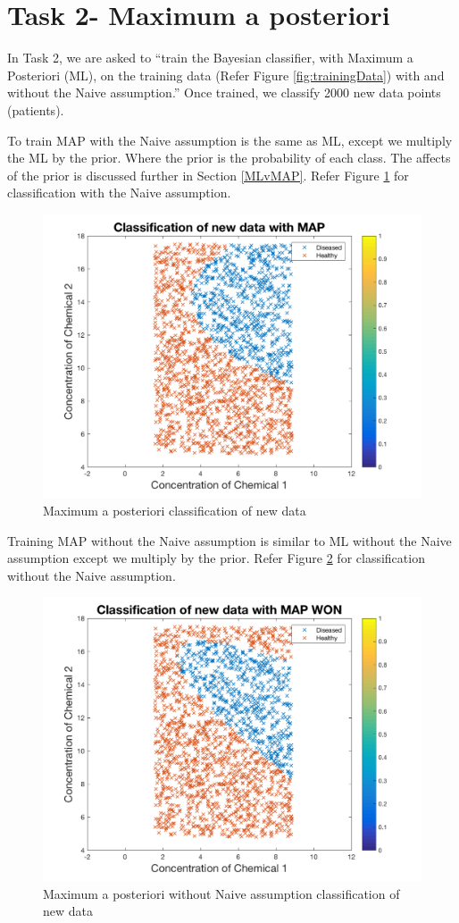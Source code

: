 \section{Task 2- Maximum a posteriori}
In Task 2, we are asked to ``train the Bayesian classifier, with Maximum a Posteriori (ML), on the training data (Refer Figure \ref{fig:trainingData}) with and without the Naive assumption.'' Once trained, we classify 2000 new data points (patients).

To train MAP with the Naive assumption is the same as ML, except we multiply the ML by the prior. Where the prior is the probability of each class. The affects of the prior is discussed further in Section \ref{MLvMAP}. Refer Figure \ref{fig:MAP} for classification with the Naive assumption.

\begin{figure}[h]
	\centering
	\includegraphics[width=0.8\linewidth]{images/MAPnewData}
	\caption{Maximum a posteriori classification of new data}
	\label{fig:MAP}
\end{figure}

Training MAP without the Naive assumption is similar to ML without the Naive assumption except we multiply by the prior. Refer Figure \ref{fig:MAPWON} for classification without the Naive assumption.

\begin{figure}[h]
	\centering
	\includegraphics[width=0.8\linewidth]{images/MAPWONnewData}
	\caption{Maximum a posteriori without Naive assumption classification of new data}
	\label{fig:MAPWON}
\end{figure}

